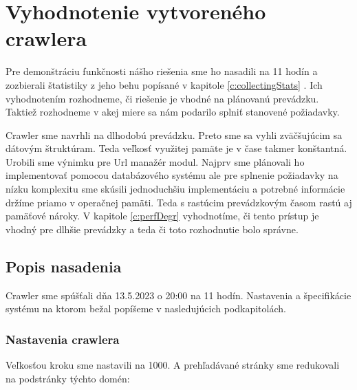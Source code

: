 
\chapter{Vyhodnotenie vytvoreného crawlera}
\label{evaluation}


Pre demonštráciu funkčnosti nášho riešenia sme ho nasadili na 11 hodín a zozbierali štatistiky z jeho behu popísané v kapitole \ref{c:collectingStats} . Ich vyhodnotením rozhodneme, či riešenie je vhodné na plánovanú prevádzku. Taktiež rozhodneme v akej miere sa nám podarilo splniť stanovené požiadavky.

Crawler sme navrhli na dlhodobú prevádzku. Preto sme sa vyhli zväčšujúcim sa dátovým štruktúram. Teda veľkosť využitej pamäte je v čase takmer konštantná. Urobili sme výnimku pre Url manažér modul. Najprv sme plánovali ho implementovať pomocou databázového systému ale pre splnenie požiadavky na nízku komplexitu sme skúsili jednoduchšiu implementáciu a potrebné informácie držíme priamo v operačnej pamäti. Teda s rastúcim prevádzkovým časom rastú aj pamäťové nároky. V kapitole \ref{c:perfDegr} vyhodnotíme, či tento prístup je vhodný pre dlhšie prevádzky a teda či toto rozhodnutie bolo správne. 


\section{Popis nasadenia}
Crawler sme spúšťali dňa 13.5.2023 o 20:00 na 11 hodín. Nastavenia a špecifikácie systému na ktorom bežal popíšeme v nasledujúcich podkapitolách. 

\subsection{Nastavenia crawlera}
Veľkosťou kroku sme nastavili na 1000. A prehľadávané stránky sme redukovali na podstránky týchto domén:

